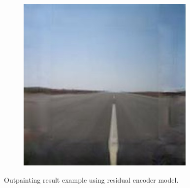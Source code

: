 \documentclass{article}
\begin{document}
\begin{figure}
	\captionsetup[subfigure]{labelformat=empty}
    \centering
    \begin{subfigure}[b]{\textwidth}
        \includegraphics[width=\textwidth]{figs/fig4/fig4}
    \end{subfigure}
  	\caption{Outpainting result example using residual encoder model.}
  	\label{fig:fig4}
\end{figure}
\end{document}
